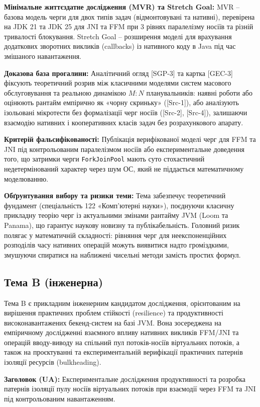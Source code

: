 \textbf{Мінімальне життєздатне дослідження (MVR) та Stretch Goal:} MVR -- базова модель черги для двох типів задач (відмонтовувані та нативні), перевірена на JDK 21 та JDK 25 для JNI та FFM при 3 рівнях паралелізму носіїв та різній тривалості блокування. Stretch Goal -- розширення моделі для врахування додаткових зворотних викликів (callbacks) із нативного коду в Java під час змішаного навантаження.

\textbf{Доказова база прогалини:} Аналітичний огляд [SGP-3] та картка [GEC-3] фіксують теоретичний розрив між класичними моделями систем масового обслуговування та реальною динамікою $M:N$ планувальників: наявні роботи або оцінюють рантайм емпірично як «чорну скриньку» ([Src-1]), або аналізують ізольовані мікротести без формалізації черг носіїв ([Src-2], [Src-4]), залишаючи взаємодію нативних і кооперативних класів задач без розрахункового апарату.

\textbf{Критерій фальсифікованості:} Публікація верифікованої моделі черг для FFM та JNI під контрольованим паралелізмом носіїв або експериментальне доведення того, що затримки черги \texttt{ForkJoinPool} мають суто стохастичний недетермінований характер через шум ОС, який не піддається математичному моделюванню.

\textbf{Обґрунтування вибору та ризики теми:} Тема забезпечує теоретичний фундамент (спеціальність 122 «Комп'ютерні науки»), поєднуючи класичну прикладну теорію черг із актуальними змінами рантайму JVM (Loom та Panama), що гарантує наукову новизну та публікабельність. Головний ризик полягає у математичній складності: рівняння черг для неекспоненційних розподілів часу нативних операцій можуть виявитися надто громіздкими, змушуючи спиратися на наближені чисельні методи замість простих формул.

\subsection{Тема B (інженерна)}

Тема B є прикладним інженерним кандидатом дослідження, орієнтованим на вирішення практичних проблем стійкості (resilience) та продуктивності високонавантажених бекенд-систем на базі JVM. Вона зосереджена на емпіричному дослідженні взаємного впливу нативних викликів FFM/JNI та операцій вводу-виводу на спільний пул потоків-носіїв віртуальних потоків, а також на проєктуванні та експериментальній верифікації практичних патернів ізоляції ресурсів (bulkheading).

\textbf{Заголовок (UA):} Експериментальне дослідження продуктивності та розробка патернів ізоляції пулу носіїв віртуальних потоків при взаємодії через FFM та JNI під контрольованим навантаженням.

